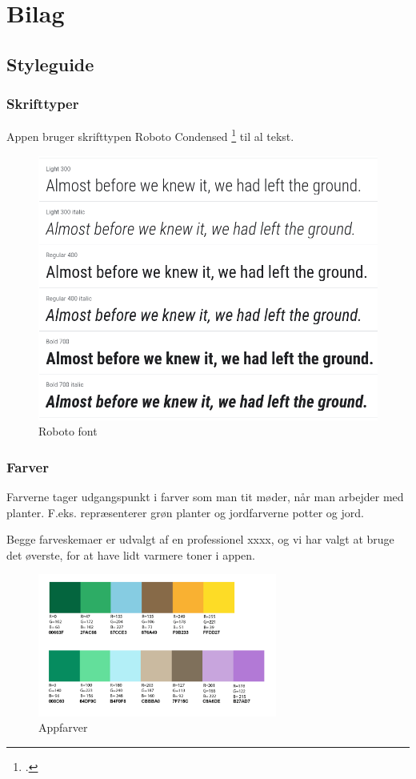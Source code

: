 \section{Bilag}
\subsection{Styleguide}

\subsubsection*{Skrifttyper}

Appen bruger skrifttypen Roboto Condensed \footcite{roboto-condensed} til al tekst.

\begin{figure}[H]
    \label{font}
    \centering
    \includegraphics[width=1\textwidth]{img/s1-11.png}
    \caption{Roboto font}
\end{figure}

\subsubsection*{Farver}

Farverne tager udgangspunkt i farver som man tit møder, når man arbejder med planter. F.eks. repræsenterer grøn planter og jordfarverne potter og jord.

Begge farveskemaer er udvalgt af en professionel xxxx, og vi har valgt at bruge det øverste, for at have lidt varmere toner i appen.

\begin{figure}[H]
    \label{farver}
    \centering
    \includegraphics[width=0.7\textwidth]{img/colors.png}
    \caption{Appfarver}
\end{figure}

